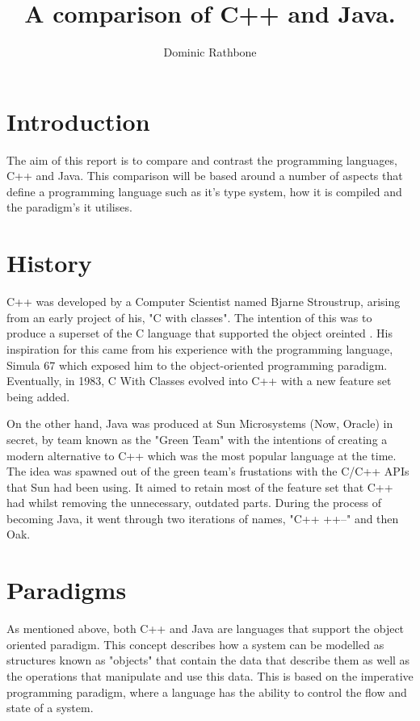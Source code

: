 \documentclass[]{report}
\title{A comparison of C++ and Java.}
\author{Dominic Rathbone}
\begin{document}
\maketitle
\section{Introduction}
The aim of this report is to compare and contrast the programming languages, C++ and Java. This comparison will be based around a number of aspects that define a programming language such as it's type system, how it is compiled and the paradigm's it utilises.

\section{History}
C++ was developed by a Computer Scientist named Bjarne Stroustrup, arising from an early project of his, "C with classes". The intention of this was to produce a superset of the C language that supported the object oreinted . His inspiration for this came from his experience with the programming language, Simula 67 which exposed him to the object-oriented programming paradigm. Eventually, in 1983, C With Classes evolved into C++ with a new feature set being added. \cite{HistoryC++}

On the other hand, Java was produced at Sun Microsystems (Now, Oracle) in secret, by team known as the "Green Team" with the intentions of creating a modern alternative to C++ which was the most popular language at the time. The idea was spawned out of the green team's frustations with the C/C++ APIs that Sun had been using. It aimed to retain most of the feature set that C++ had whilst removing the unnecessary, outdated parts. During the process of becoming Java, it went through two iterations of names, "C++ ++--" and then Oak.\cite{HistoryJava}

\section{Paradigms}
As mentioned above, both C++ and Java are languages that support the object oriented paradigm. This concept describes how a system can be modelled as structures known as "objects" that contain the data that describe them as well as the operations that manipulate and use this data. This is based on the imperative programming paradigm, where a language has the ability to control the flow and state of a system. \cite{Paradigms}
\end{document}
